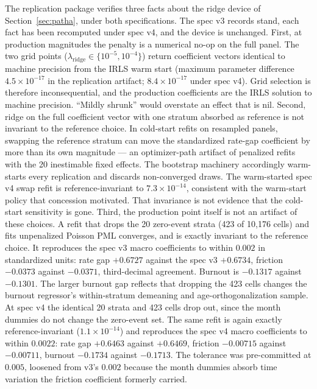\documentclass[12pt]{article}
\begin{document}
The replication package verifies three facts about the ridge device of Section~\ref{sec:patha}, under both specifications. The spec v3 records stand, each fact has been recomputed under spec v4, and the device is unchanged. First, at production magnitudes the penalty is a numerical no-op on the full panel. The two grid points ($\lambda_{\mathrm{ridge}} \in \{10^{-5}, 10^{-4}\}$) return coefficient vectors identical to machine precision from the IRLS warm start (maximum parameter difference $4.5\times10^{-17}$ in the replication artifact; $8.4\times10^{-17}$ under spec v4). Grid selection is therefore inconsequential, and the production coefficients are the IRLS solution to machine precision. ``Mildly shrunk'' would overstate an effect that is nil. Second, ridge on the full coefficient vector with one stratum absorbed as reference is not invariant to the reference choice. In cold-start refits on resampled panels, swapping the reference stratum can move the standardized rate-gap coefficient by more than its own magnitude --- an optimizer-path artifact of penalized refits with the 20 inestimable fixed effects. The bootstrap machinery accordingly warm-starts every replication and discards non-converged draws. The warm-started spec v4 swap refit is reference-invariant to $7.3\times10^{-14}$, consistent with the warm-start policy that concession motivated. That invariance is not evidence that the cold-start sensitivity is gone. Third, the production point itself is not an artifact of these choices. A refit that drops the 20 zero-event strata (423 of 10,176 cells) and fits unpenalized Poisson PML converges, and is exactly invariant to the reference choice. It reproduces the spec v3 macro coefficients to within $0.002$ in standardized units: rate gap $+0.6727$ against the spec v3 $+0.6734$, friction $-0.0373$ against $-0.0371$, third-decimal agreement. Burnout is $-0.1317$ against $-0.1301$. The larger burnout gap reflects that dropping the 423 cells changes the burnout regressor's within-stratum demeaning and age-orthogonalization sample. At spec v4 the identical 20 strata and 423 cells drop out, since the month dummies do not change the zero-event set. The same refit is again exactly reference-invariant ($1.1\times10^{-14}$) and reproduces the spec v4 macro coefficients to within $0.0022$: rate gap $+0.6463$ against $+0.6469$, friction $-0.00715$ against $-0.00711$, burnout $-0.1734$ against $-0.1713$. The tolerance was pre-committed at $0.005$, loosened from v3's $0.002$ because the month dummies absorb time variation the friction coefficient formerly carried.
\end{document}
